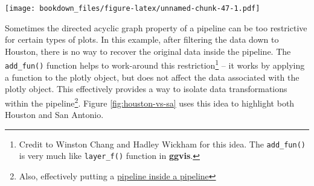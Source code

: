 \documentclass[12pt,]{isuthesis}
\newenvironment{Shaded}{\begin{snugshade}}{\end{snugshade}}
\newcommand{\KeywordTok}[1]{\textcolor[rgb]{0.13,0.29,0.53}{\textbf{{#1}}}}
\newcommand{\DataTypeTok}[1]{\textcolor[rgb]{0.13,0.29,0.53}{{#1}}}
\newcommand{\FloatTok}[1]{\textcolor[rgb]{0.00,0.00,0.81}{{#1}}}
\newcommand{\StringTok}[1]{\textcolor[rgb]{0.31,0.60,0.02}{{#1}}}
\newcommand{\NormalTok}[1]{{#1}}
\let\rmarkdownfootnote\footnote%
\def\footnote{\protect\rmarkdownfootnote}
\begin{document}
\begin{Shaded}
\end{Shaded}

\texttt{[image: bookdown\_files/figure-latex/unnamed-chunk-47-1.pdf]}

Sometimes the directed acyclic graph property of a pipeline can be too
restrictive for certain types of plots. In this example, after filtering
the data down to Houston, there is no way to recover the original data
inside the pipeline. The \texttt{add\_fun()} function helps to
work-around this restriction\footnote{Credit to Winston Chang and Hadley
  Wickham for this idea. The \texttt{add\_fun()} is very much like
  \texttt{layer\_f()} function in \textbf{ggvis}.} -- it works by
applying a function to the plotly object, but does not affect the data
associated with the plotly object. This effectively provides a way to
isolate data transformations within the pipeline\footnote{Also,
  effectively putting a
  \href{http://www.memecreator.org/meme/yo-dawg-i-heard-u-like-pipelines-so-we-put-a-pipeline-in-your-pipeline}{pipeline
  inside a pipeline}}. Figure \ref{fig:houston-vs-sa} uses this idea to
highlight both Houston and San Antonio.

\begin{Shaded}
\end{Shaded}
\end{document}
